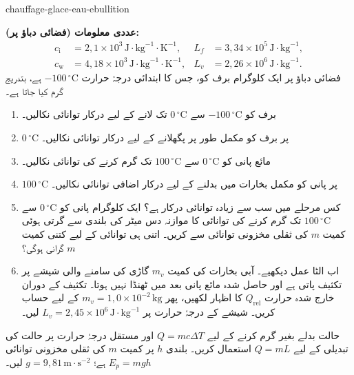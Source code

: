 
\begin{exo}{chauffage-glace-eau-ebullition}

\textbf{عددی معلومات (فضائی دباؤ پر):}
\[
\begin{aligned}
c_{\mathrm{i}} &= 2{,}1\times10^3\,\text{J}\!\cdot\!\text{kg}^{-1}\!\cdot\!\text{K}^{-1},
& L_f &= 3{,}34\times10^5\,\text{J}\!\cdot\!\text{kg}^{-1},\\
c_{\mathrm{w}} &= 4{,}18\times10^3\,\text{J}\!\cdot\!\text{kg}^{-1}\!\cdot\!\text{K}^{-1},
& L_v &= 2{,}26\times10^6\,\text{J}\!\cdot\!\text{kg}^{-1}.
\end{aligned}
\]
فضائی دباؤ پر ایک کلوگرام برف کو، جس کا ابتدائی درجۂ حرارت $-100\,{}^\circ\text{C}$ ہے، بتدریج گرم کیا جاتا ہے۔

\begin{enumerate}
  \item برف کو $-100\,{}^\circ\text{C}$ سے $0\,{}^\circ\text{C}$ تک لانے کے لیے درکار توانائی نکالیں۔
  \item $0\,{}^\circ\text{C}$ پر برف کو مکمل طور پر پگھلانے کے لیے درکار توانائی نکالیں۔
  \item مائع پانی کو $0\,{}^\circ\text{C}$ سے $100\,{}^\circ\text{C}$ تک گرم کرنے کی توانائی نکالیں۔
  \item $100\,{}^\circ\text{C}$ پر پانی کو مکمل بخارات میں بدلنے کے لیے درکار اضافی توانائی نکالیں۔
  \item کس مرحلے میں سب سے زیادہ توانائی درکار ہے؟ ایک کلوگرام پانی کو $0\,{}^\circ\text{C}$ سے $100\,{}^\circ\text{C}$ تک گرم کرنے کی توانائی کا موازنہ دس میٹر کی بلندی سے گرتی ہوئی کمیت $m$ کی ثقلی مخزونی توانائی سے کریں۔ اتنی ہی توانائی کے لیے کتنی کمیت $m$ گرانی ہوگی؟
  \item اب الٹا عمل دیکھیے۔ آبی بخارات کی کمیت $m_v$ گاڑی کی سامنے والی شیشے پر تکثیف پاتی ہے اور حاصل شدہ مائع پانی بعد میں ٹھنڈا نہیں ہوتا۔ تکثیف کے دوران خارج شدہ حرارت $Q_{\mathrm{rel}}$ کا اظہار لکھیں، پھر $m_v=1{,}0\times10^{-2}\,\text{kg}$ کے لیے حساب کریں۔ شیشے کے درجۂ حرارت پر $L_v=2{,}45\times10^6\,\text{J}\!\cdot\!\text{kg}^{-1}$ لیں۔
\end{enumerate}

\begin{indication}
حالت بدلے بغیر گرم کرنے کے لیے $Q=mc\Delta T$ اور مستقل درجۂ حرارت پر حالت کی تبدیلی کے لیے $Q=mL$ استعمال کریں۔ بلندی $h$ پر کمیت $m$ کی ثقلی مخزونی توانائی $E_p=mgh$ ہے؛ $g=9{,}81\,\text{m}\!\cdot\!\text{s}^{-2}$ لیں۔
\end{indication}


\end{exo}
